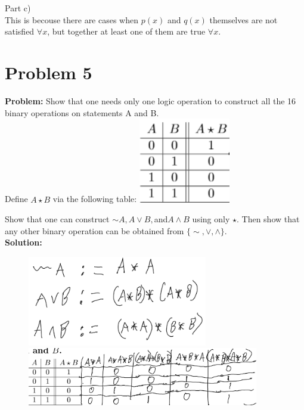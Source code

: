 \documentclass[]{article}
\begin{document}
Part c)\\
This is becouse there are cases when $p(x)$ and $q(x)$ themselves are not 
satisfied $\forall x$, but together at least one of them are true $\forall x$.


\newpage
\section{Problem 5}
\textbf{Problem:}
Show that one needs only one logic operation to construct all the 16 binary operations on statements A and B.\\
Define $A \star B$ via the following table:
\includegraphics[width=0.3\textwidth]{fig/pblm5_star_TF_table.png}

Show that one can construct $\sim A, A \lor B, $and$ A \land B$ using only $\star$.
Then show that any other binary operation can be obtained from $\{\sim, \lor, \land\}$.\\

\textbf{Solution:}
\begin{figure}[h]
	\centering
	\includegraphics[width=0.7\textwidth]{fig/pblm5_star2op_soln.png}
	\includegraphics[width=0.9\textwidth]{fig/pblm5_star2op_table.png}	
\end{figure}
\end{document}

